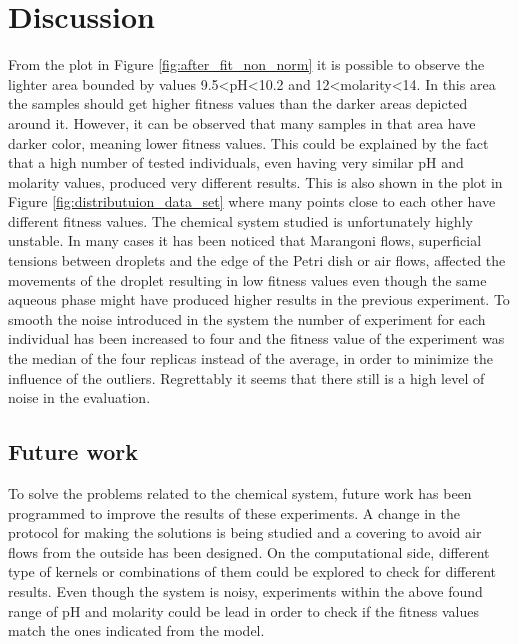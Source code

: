 \documentclass[a4paper]{article}
\begin{document}
\section{Discussion}
From the plot in Figure \ref{fig:after_fit_non_norm} it is possible to observe the lighter area bounded by values 9.5<pH<10.2 and 12<molarity<14. In this area the samples should get higher fitness values than the darker areas depicted around it. However, it can be observed that many samples in that area have darker color, meaning lower fitness values. This could be explained by the fact that a high number of tested individuals, even having very similar pH and molarity values, produced very different results. 
This is also shown in the plot in Figure \ref{fig:distributuion_data_set} where many points close to each other have different fitness values.
The chemical system studied is unfortunately highly unstable. In many cases it has been noticed that Marangoni flows, superficial tensions between droplets and the edge of the Petri dish or air flows, affected the movements of the droplet resulting in low fitness values even though the same aqueous phase might have produced higher results in the previous experiment. 
To smooth the noise introduced in the system the number of experiment for each individual has been increased to four and the fitness value of the experiment was the median of the four replicas instead of the average, in order to minimize the influence of the outliers.
Regrettably it seems that there still is a high level of noise in the evaluation.
 
\subsection{Future work}
To solve the problems related to the chemical system, future work has been programmed to improve the results of these experiments. A change in the protocol for making the solutions is being studied and a covering to avoid air flows from the outside has been designed. 
On the computational side, different type of kernels or combinations of them could be explored to check for different results. 
Even though the system is noisy, experiments within the above found range of pH and molarity could be lead in order to check if the fitness values match the ones indicated from the model. 

\newpage
\end{document}
